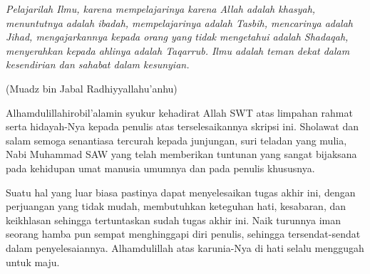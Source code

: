 \documentclass[skripsi]{unhasskripsi}
\theoremstyle{definition}
\begin{document}
\cover

\titlepageind

\approvalpage

\acknowledment
\begin{flushright}
\Large\emph{}
\end{flushright}

\motto
\emph{Pelajarilah Ilmu, karena mempelajarinya karena Allah adalah khasyah, menuntutnya adalah ibadah, mempelajarinya adalah Tasbih, mencarinya adalah Jihad, mengajarkannya kepada orang yang tidak mengetahui adalah Shadaqah, menye\-rahkan kepada ahlinya adalah Taqarrub. Ilmu adalah teman dekat dalam kesendirian dan sahabat dalam kesunyian.}
\begin{flushright}
(Muadz bin Jabal Radhiyyallahu'anhu)
\end{flushright}

\preface
Alhamdulillahirobil'alamin syukur kehadirat Allah SWT atas limpahan rahmat serta hidayah-Nya kepada penulis atas terselesaikannya skripsi ini. Sholawat dan salam semoga senantiasa tercurah kepada junjungan, suri teladan yang mulia, Nabi Muhammad SAW yang telah memberikan tuntunan yang sangat bijaksana pada kehidupan umat manusia umumnya dan pada penulis khususnya.

Suatu hal yang luar biasa pastinya dapat menyelesaikan tugas akhir ini, de\-ngan perjuangan yang tidak mudah, membutuhkan keteguhan hati, kesabaran, dan keikhlasan sehingga tertuntaskan sudah tugas akhir ini. Naik turunnya iman seorang hamba pun sempat menghinggapi diri penulis, sehingga tersendat-sendat dalam penyelesaiannya. Alhamdulillah atas karunia-Nya di hati selalu menggugah untuk maju.
\end{document}
